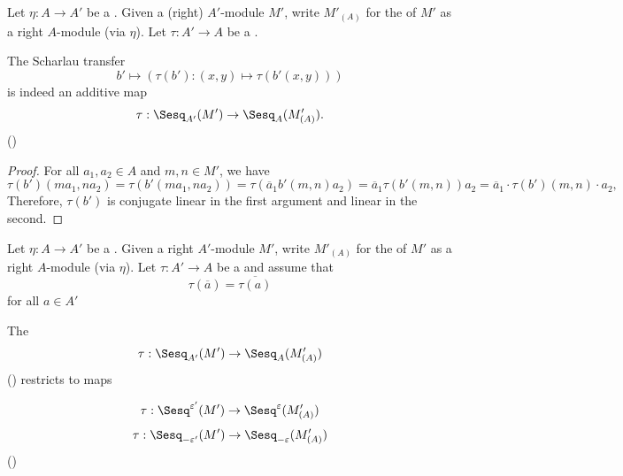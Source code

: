
\begin{lemma} \label{lemma:scharlau_transfer_of_sesquilinear_forms_on_modules_under_involution_ring_homomorphism_is_indeed_an_additive_map_between_groups_of_sesquilinear_forms}
    Let $\eta: A \to A'$ be a . 
    Given a (right) $A'$-module $M'$, write $M'_{(A)}$ for the  of $M'$ as a right $A$-module (via $\eta$). Let $\tau: A' \to A$ be a .

    The Scharlau transfer 
    $$b' \mapsto (\tau(b'): (x,y) \mapsto \tau(b'(x,y)))$$
    is indeed an additive map 
    $$\tau: \Sesq_{A'}(M') \to \Sesq_A(M'_{(A)}).$$
    ()
\end{lemma}
\begin{proof}
    For all $a_1,a_2 \in A$ and $m,n \in M'$, we have 
    $$\tau(b')(m a_1,n a_2) = \tau(b'(m a_1,n a_2)) = \tau( \overline{a}_1 b'(m, n) a_2) = \overline{a}_1 \tau(b'(m,n)) a_2 = \overline{a}_1 \cdot \tau(b')(m,n) \cdot a_2,$$
    Therefore, $\tau(b')$ is conjugate linear in the first argument and linear in the second. 
\end{proof}

\begin{lemma}
    Let $\eta: A \to A'$ be a . 
    Given a right $A'$-module $M'$, write $M'_{(A)}$ for the  of $M'$ as a right $A$-module (via $\eta$). Let $\tau: A' \to A$ be a  and assume that 
    $$\tau(\overline{a}) = \overline{\tau(a)}$$
    for all $a \in A'$

    The 
    $$\tau: \Sesq_{A'}(M') \to \Sesq_A(M'_{(A)})$$
    () restricts to maps 

    $$\tau: \Sesq^{\varepsilon'}(M') \to \Sesq^{\varepsilon}(M'_{(A)})$$
    $$\tau: \Sesq_{-\varepsilon'}(M') \to \Sesq_{-\varepsilon}(M'_{(A)})$$
    ()
\end{lemma}

